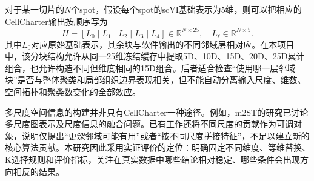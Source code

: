 对于某一切片的$N$个spot，假设每个spot的scVI基础表示为5维，则可以把相应的CellCharter输出按顺序写为
\begin{equation}
H=[L_0\mid L_1\mid L_2\mid L_3\mid L_4]
\in\mathbb{R}^{N\times25},\quad L_\ell\in\mathbb{R}^{N\times5}.
\end{equation}
其中$L_0$对应原始基础表示，其余块与软件输出的不同邻域层相对应。在本项目中，该分块结构允许从同一25维冻结缓存中提取5D、10D、15D、20D、25D累计组合，也允许构造不同但维度相同的15D组合。后者适合检查“使用哪一层邻域块”是否与整体聚类和局部组织边界表现相关，但不能自动分离输入尺度、维数、空间拓扑和聚类数变化的全部效应。

多尺度空间信息的构建并非只有CellCharter一种途径。例如，m2ST的研究已讨论多尺度图表示及尺度信息的融合问题\cite{zhang2025}。已有工作还将不同尺度的贡献作为可调对象，说明仅提出“更深邻域可能有用”或者“按不同尺度拼接特征”，不足以建立新的核心算法贡献。本研究因此采用实证评价的定位：明确固定不同维度、等维替换、K选择规则和评价指标，关注在真实数据中哪些结论相对稳定、哪些条件会出现方向相反的结果。

